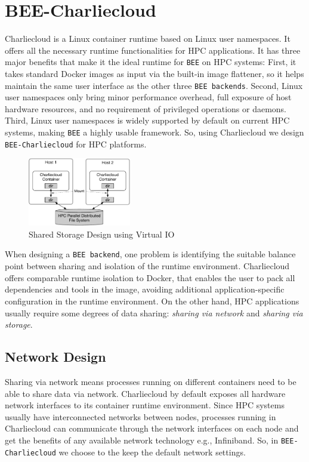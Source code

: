 \section{BEE-Charliecloud}
\label{bee-charliecloud-section}
Charliecloud \cite{priedhorsky2016charliecloud} is a Linux container runtime based on Linux user namespaces. It offers all the necessary runtime functionalities for HPC applications. It has three major benefits that make it the ideal runtime for \texttt{BEE} on HPC systems: First, it takes standard Docker images as input via the built-in image flattener, so it helps maintain the same user interface as the other three \texttt{BEE backends}. Second, Linux user namespaces only bring minor performance overhead, full exposure of host hardware resources, and no requirement of privileged operations or daemons. Third, Linux user namespaces is widely supported by default on current HPC systems,  making \texttt{BEE} a highly usable framework. So, using Charliecloud we design \texttt{BEE-Charliecloud} for HPC platforms.

\begin{figure}[h]
    \centering
    \includegraphics[width=0.4\textwidth]{figures/bee-cc.pdf}
    \caption{Shared Storage Design using Virtual IO}
    \label{bee-cc}
    \vspace*{-1em}
\end{figure}

When designing a \texttt{BEE backend}, one problem is identifying the suitable balance point between sharing and isolation of the runtime environment. Charliecloud offers comparable runtime isolation to Docker, that enables the user to pack all dependencies and tools in the image, avoiding additional application-specific configuration in the runtime environment. On the other hand, HPC applications usually require some degrees of data sharing: \textit{sharing via network} and \textit{sharing via storage}. 

\subsection{Network Design}
Sharing via network means processes running on different containers need to be able to share data via network. Charliecloud by default exposes all hardware network interfaces to its container runtime environment. Since HPC systems usually have interconnected networks between nodes, processes running in Charliecloud can communicate through the network interfaces on each node and get the benefits of any available network technology e.g., Infiniband. So, in \texttt{BEE-Charliecloud} we choose to the keep the default network settings. 

